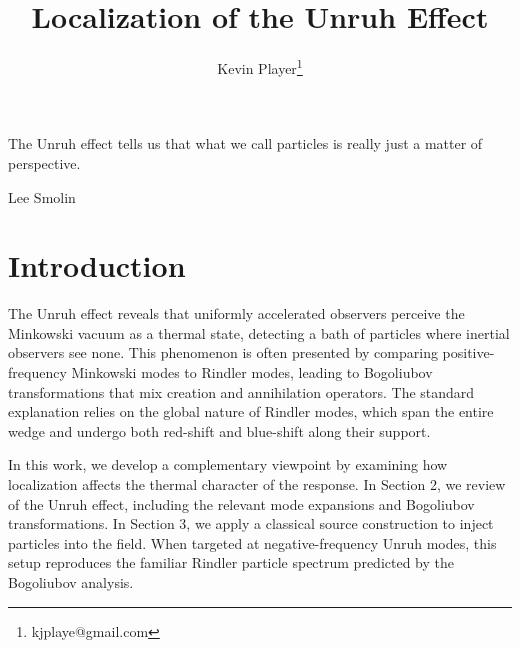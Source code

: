 \documentclass[12pt,a4paper]{article}
\begin{document}
\title{Localization of the Unruh Effect}
\author[1]{Kevin Player\footnote{kjplaye@gmail.com}}

\maketitle

\epigraph{The Unruh effect tells us that what we call particles is really just a matter of perspective.}{Lee Smolin}



\section{Introduction}

The Unruh effect\cite{unruh1976notes} reveals that uniformly accelerated observers perceive the Minkowski vacuum as a thermal state, detecting a bath of particles where inertial observers see none. This phenomenon is often presented by comparing positive-frequency Minkowski modes to Rindler modes, leading to Bogoliubov transformations that mix creation and annihilation operators\cite{crispino2008unruh}. The standard explanation relies on the global nature of Rindler modes, which span the entire wedge and undergo both red-shift and blue-shift along their support.

In this work, we develop a complementary viewpoint by examining how localization affects the thermal character of the response. In Section 2, we review of the Unruh effect, including the relevant mode expansions and Bogoliubov transformations. In Section 3, we apply a classical source construction \cite{Schwinger_1966} to inject particles into the field. When targeted at negative-frequency Unruh modes, this setup reproduces the familiar Rindler particle spectrum predicted by the Bogoliubov analysis.
\end{document}
